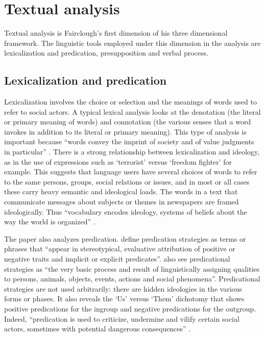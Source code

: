 \documentclass[output=paper,modfonts]{langscibook}
\begin{document}
\section{Textual analysis}\label{sec:ofori:3}

Textual analysis is Fairclough’s first dimension of his three dimensional framework. The linguistic tools employed under this dimension in the analysis are lexicalization and predication, presupposition and verbal process.

\subsection{Lexicalization and predication}\label{sec:ofori:3.1}

Lexicalization involves the choice or selection and the meanings of words used to refer to social actors. A typical lexical analysis looks at the denotation (the literal or primary meaning of words) and connotation (the various senses that a word invokes in addition to its literal or primary meaning). This type of analysis is important because “words convey the imprint of society and of value judgments in particular” \citep[47]{Richardson2007}. There is a strong relationship between lexicalization and ideology, as in the use of expressions such as ‘terrorist’ versus ‘freedom fighter’ for example. This suggests that language users have several choices of words to refer to the same persons, groups, social relations or issues, and in most or all cases these carry heavy semantic and ideological loads. The words in a text that communicate messages about subjects or themes in newspapers are framed ideologically. Thus “vocabulary encodes ideology, systems of beliefs about the way the world is organized” \citep[69]{Fowler1987}.

The paper also analyzes predication. \citet[27]{WodakMeyer2009} define predication strategies as terms or phrases that “appear in stereotypical, evaluative attribution of positive or negative traits and implicit or explicit predicates”. \citet[54]{ResiglWodak2001} 
 also see predicational strategies as “the very basic process and result of linguistically assigning qualities to persons, animals, objects, events, actions and social phenomena”. Predicational strategies are not used arbitrarily: there are hidden ideologies in the various forms or phases. It also reveals the ‘Us’ versus ‘Them’ dichotomy that shows positive predications for the ingroup and negative predications for the outgroup. Indeed, “predication is used to criticize, undermine and vilify certain social actors, sometimes with potential dangerous consequences” \citep[53]{Richardson2007}.
\end{document}
